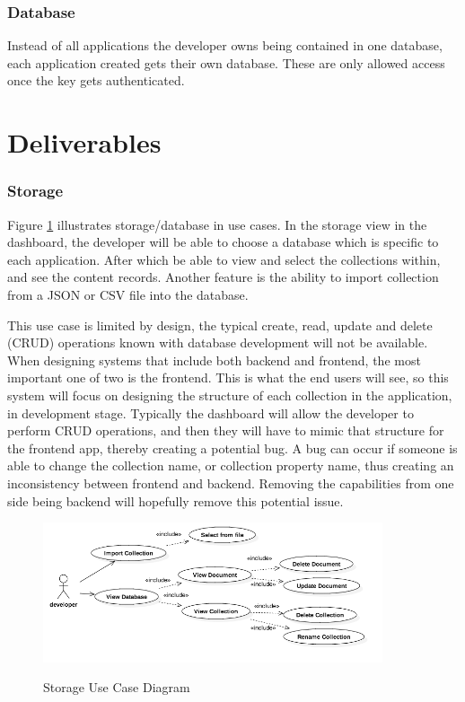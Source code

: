 \subsubsection{Database}
Instead of all applications the developer owns being contained in one database, each application created gets their own database. These are only allowed access once the key gets authenticated.

\section{Deliverables}

\subsubsection{Storage}

Figure \ref{fig:storage_use_case} illustrates storage/database in use cases. In the storage view in the dashboard, the developer will be able to choose a database which is specific to each application. After which be able to view and select the collections within, and see the content records. Another feature is the ability to import collection from a JSON or CSV file into the database.

This use case is limited by design, the typical create, read, update and delete (CRUD) operations known with database development will not be available. When designing systems that include both backend and frontend, the most important one of two is the frontend. This is what the end users will see, so this system will focus on designing the structure of each collection in the application, in development stage. Typically the dashboard will allow the developer to perform CRUD operations, and then they will have to mimic that structure for the frontend app, thereby creating a potential bug. A bug can occur if someone is able to change the collection name, or collection property name, thus creating an inconsistency between frontend and backend. Removing the capabilities from one side being backend will hopefully remove this potential issue. 

\begin{figure}[!h]
    \caption{Storage Use Case Diagram}
    \centering
    \includegraphics[width=100mm]{images/use_cases/storage_use_case}
    \label{fig:storage_use_case}
\end{figure}

